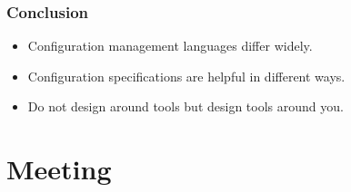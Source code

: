 \begin{frame}
	\frametitle{Conclusion}

	\begin{itemize}[<+-| alert@+>]
	\item Configuration management languages differ widely.
	\item Configuration specifications are helpful in different ways.
	\item Do not design around tools but design tools around you.
	\end{itemize}
\end{frame}

\section{Meeting}

